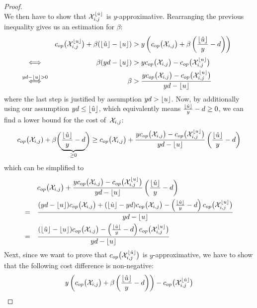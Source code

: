 \begin{proof}
\begin{equation*}
\end{equation*}
We then have to show that $\mathcal{X}_{i,j}^{\lfloor\hat{u}\rfloor}$ is $y$-approximative.
Rearranging the previous inequality gives us an estimation for $\beta$:
\begin{align*}
	&&\opcosts\bigl(\mx_{i,j}^{\floor{u}}\bigr)+\beta(\floor{\hat{u}}-\floor{u})&>y\left(\opcosts\bigl(\mx_{i,j}\bigr)+\beta\left(\frac{\floor{\hat{u}}}{y}-d\right)\right)
&\\
	&\stackrel{\phantom{yd-\floor{u}>0}}{\iff}&\beta(yd-\floor{u})&>y\opcosts\bigl(\mx_{i,j}\bigr)-\opcosts\bigl(\mx_{i,j}^{\floor{u}}\bigr)&\\
	&\stackrel{yd-\floor{u}>0}{\iff}&\beta&>\frac{y\opcosts\bigl(\mx_{i,j}\bigr)-\opcosts\bigl(\mx_{i,j}^{\floor{u}}\bigr)}{yd-\floor{u}}
\end{align*}
where the last step is justified by assumption $yd>\lfloor u\rfloor$. Now, by additionally using our assumption $yd\le\lfloor\hat{u}\rfloor$, which equivalently means $\frac{\lfloor\hat{u}\rfloor}{y}-d\ge0$, we can find a lower bound for the cost of~$\mathcal{X}_{i,j}$:
\begin{equation*}
	c_{op}\bigl(\mathcal{X}_{i,j})+\beta\biggl(\underbrace{\frac{\lfloor\hat{u}\rfloor}{y}-d}_{\ge 0}\biggr)\ge c_{op}\bigl(\mathcal{X}_{i,j}\bigr)+\frac{yc_{op}\bigl(\mathcal{X}_{i,j}\bigr)-c_{op}\bigl(\mathcal{X}_{i,j}^{\lfloor u\rfloor}\bigr)}{yd-\lfloor u\rfloor}\left(\frac{\lfloor\hat{u}\rfloor}{y}-d\right)
\end{equation*}
which can be simplified to
\begin{align*}
	&c_{op}\bigl(\mathcal{X}_{i,j}\bigr)+\frac{yc_{op}\bigl(\mathcal{X}_{i,j}\bigr)-c_{op}\bigl(\mathcal{X}_{i,j}^{\lfloor u\rfloor}\bigr)}{yd-\lfloor u\rfloor}\left(\frac{\lfloor\hat{u}\rfloor}{y}-d\right)\\
	=\quad&\frac{(yd-\lfloor u\rfloor)c_{op}\bigl(\mathcal{X}_{i,j}\bigr)+(\lfloor\hat{u}\rfloor-yd)c_{op}\bigl(\mathcal{X}_{i,j}\bigr)-\left(\frac{\lfloor\hat{u}\rfloor}{y}-d\right)c_{op}\bigl(\mathcal{X}_{i,j}^{\lfloor u\rfloor}\bigr)}{yd-\lfloor u\rfloor}\\
	=\quad&\frac{(\lfloor\hat{u}\rfloor-\lfloor u\rfloor)c_{op}\bigl(\mathcal{X}_{i,j}\bigr)-\left(\frac{\lfloor\hat{u}\rfloor}{y}-d\right)c_{op}\bigl(\mathcal{X}_{i,j}^{\lfloor u\rfloor}\bigr)}{yd-\lfloor u\rfloor}
\end{align*}
Next, since we want to prove that $c_{op}\bigl(\mathcal{X}_{i,j}^{\lfloor\hat{u}\rfloor}\bigr)$ is $y$-approximative, we have to show that the following cost difference is non-negative:
\begin{align*}
	y\left(c_{op}\bigl(\mathcal{X}_{i,j}\bigr)+\beta\left(\frac{\lfloor\hat{u}\rfloor}{y}-d\right)\right)-c_{op}\bigl(\mathcal{X}_{i,j}^{\lfloor\hat{u}\rfloor}\bigr)
\end{align*}

\end{proof}
